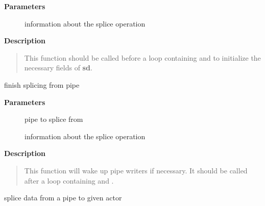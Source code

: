 \documentclass[a4paper,8pt,english]{sphinxmanual}
\begin{document}
\textbf{Parameters}
\begin{description}
\item[{}] \leavevmode
information about the splice operation

\end{description}

\textbf{Description}
\begin{quote}

This function should be called before a loop containing
{\hyperref[filesystems/index:c.splice_from_pipe_next]{\emph{}}} and {\hyperref[filesystems/index:c.splice_from_pipe_feed]{\emph{}}} to
initialize the necessary fields of \textbf{sd}.
\end{quote}

\begin{fulllineitems}
\label{filesystems/index:c.splice_from_pipe_end}
finish splicing from pipe

\end{fulllineitems}


\textbf{Parameters}
\begin{description}
\item[{}] \leavevmode
pipe to splice from

\item[{}] \leavevmode
information about the splice operation

\end{description}

\textbf{Description}
\begin{quote}

This function will wake up pipe writers if necessary.  It should
be called after a loop containing {\hyperref[filesystems/index:c.splice_from_pipe_next]{\emph{}}} and
{\hyperref[filesystems/index:c.splice_from_pipe_feed]{\emph{}}}.
\end{quote}

\begin{fulllineitems}
\label{filesystems/index:c.__splice_from_pipe}
splice data from a pipe to given actor

\end{fulllineitems}
\end{document}
